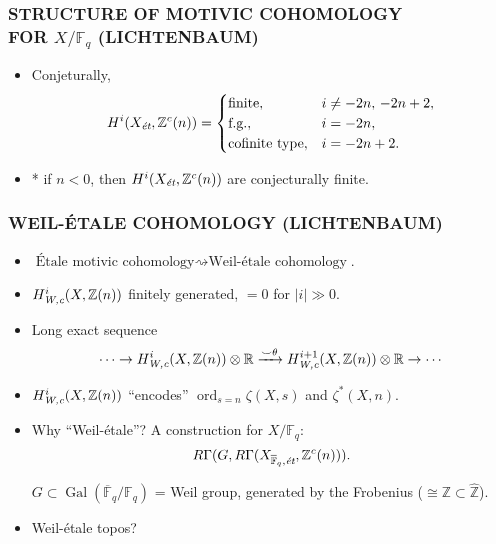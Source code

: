 \documentclass[handout]{beamer}
\newcommand{\FF}{\mathbb{F}}
\newcommand{\RR}{\mathbb{R}}
\newcommand{\ZZ}{\mathbb{Z}}
\DeclareMathOperator{\Gal}{Gal}
\DeclareMathOperator{\ord}{ord}
\newcommand{\et}{\text{\it ét}}
\newcommand{\Wc}{\text{\it W,c}}
\begin{document}
\begin{frame}
  \frametitle{STRUCTURE OF MOTIVIC COHOMOLOGY\\
    FOR $X/\FF_q$ (LICHTENBAUM)}

  \begin{itemize}
  \item<2-> Conjeturally,
    \[ H^i (X_\et, \ZZ^c (n)) = \begin{cases}
        \text{finite}, & i \ne -2n, \, -2n+2, \\
        \text{f.g.}, & i = -2n, \\
        \text{cofinite type}, & i = -2n + 2.
      \end{cases} \]

  \item<3-> * if $n < 0$, then $H^i (X_\et, \ZZ^c (n))$ are conjecturally
    finite.
  \end{itemize}
\end{frame}


\begin{frame}
  \frametitle{WEIL-ÉTALE COHOMOLOGY (LICHTENBAUM)}

  \begin{itemize}
  \item<2-> $\text{Étale motivic cohomology} \rightsquigarrow
    \text{Weil-étale cohomology}$.

  \item<3-> $H^i_\Wc (X,\ZZ(n))$ finitely generated, $= 0$ for $|i| \gg 0$.

  \item<4-> Long exact sequence
    $$\cdots \to H^i_\Wc (X,\ZZ(n)) \otimes \RR \xrightarrow{\smile\theta} H^{i+1}_\Wc (X,\ZZ(n)) \otimes \RR \to \cdots$$

  \item<5-> $H^i_\Wc (X, \ZZ(n))$ ``encodes'' $\ord_{s=n} \zeta (X,s)$ and
    $\zeta^* (X,n)$.

  \item<6-> Why ``Weil-étale''?
    A construction for $X/\FF_q$:
      \[ R\Gamma (G, R\Gamma (X_{\overline{\FF}_q,\et}, \ZZ^c (n))). \]

      $G \subset \Gal (\overline{\FF}_q/\FF_q)$ = Weil group, generated by the
      Frobenius ($\cong \ZZ \subset \widehat{\ZZ}$).

    \item<7-> Weil-étale topos?
  \end{itemize}
\end{frame}
\end{document}
